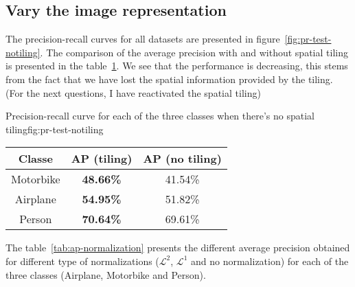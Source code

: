 \documentclass{article}
\begin{document}
\subsection{Vary the image representation}


The precision-recall curves for all datasets are presented in
figure~\ref{fig:pr-test-notiling}. The comparison of the average
precision with and without spatial tiling is presented in the
table~\ref{tab:ap-notiling}. We see that the performance is
decreasing, this stems from the fact that we have lost the spatial
information provided by the tiling. (For the next questions, I
have reactivated the spatial tiling)

\triplefign
{}
{}
{}
{Precision-recall curve for each of the three classes when there's no spatial tiling}{fig:pr-test-notiling}

\begin{table}[h!]
  \centering
  \begin{tabular}{| c | c | c |}
    \hline
    Classe & AP (tiling) & AP (no tiling) \\
    \hline
    Motorbike & \textbf{48.66\%} & 41.54\%\\
    Airplane  & \textbf{54.95\%} & 51.82\% \\
    Person    & \textbf{70.64\%} & 69.61\%\\
    \hline
  \end{tabular}
   \label{tab:ap-notiling}
\end{table}


The table~\ref{tab:ap-normalization} presents the different average
precision obtained for different type of normalizations
($\mathcal{L}^2$, $\mathcal{L}^1$ and no normalization) for each of
the three classes (Airplane, Motorbike and Person).
\end{document}
